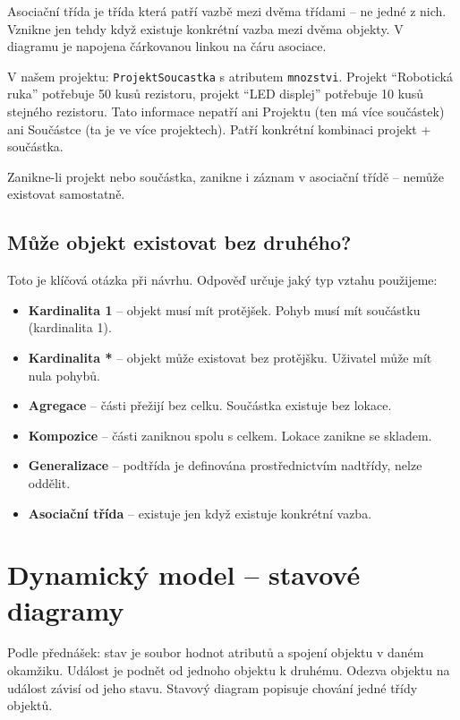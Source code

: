 \documentclass[12pt, a4paper]{article}
\begin{document}
Asociační třída je třída která patří vazbě mezi dvěma třídami -- ne jedné z nich. Vznikne jen tehdy když existuje konkrétní vazba mezi dvěma objekty. V diagramu je napojena čárkovanou linkou na čáru asociace.

V našem projektu: \texttt{ProjektSoucastka} s atributem \texttt{mnozstvi}. Projekt ``Robotická ruka'' potřebuje 50 kusů rezistoru, projekt ``LED displej'' potřebuje 10 kusů stejného rezistoru. Tato informace nepatří ani Projektu (ten má více součástek) ani Součástce (ta je ve více projektech). Patří konkrétní kombinaci projekt + součástka.

Zanikne-li projekt nebo součástka, zanikne i záznam v asociační třídě -- nemůže existovat samostatně.

\subsection{Může objekt existovat bez druhého?}

Toto je klíčová otázka při návrhu. Odpověď určuje jaký typ vztahu použijeme:

\begin{itemize}
  \item \textbf{Kardinalita 1} -- objekt musí mít protějšek. Pohyb musí mít součástku (kardinalita 1).
  \item \textbf{Kardinalita *} -- objekt může existovat bez protějšku. Uživatel může mít nula pohybů.
  \item \textbf{Agregace} -- části přežijí bez celku. Součástka existuje bez lokace.
  \item \textbf{Kompozice} -- části zaniknou spolu s celkem. Lokace zanikne se skladem.
  \item \textbf{Generalizace} -- podtřída je definována prostřednictvím nadtřídy, nelze oddělit.
  \item \textbf{Asociační třída} -- existuje jen když existuje konkrétní vazba.
\end{itemize}

\section{Dynamický model -- stavové diagramy}

Podle přednášek: stav je soubor hodnot atributů a spojení objektu v daném okamžiku. Událost je podnět od jednoho objektu k druhému. Odezva objektu na událost závisí od jeho stavu. Stavový diagram popisuje chování jedné třídy objektů.
\end{document}
